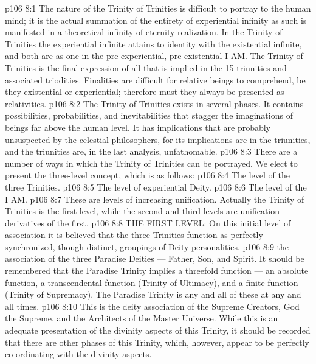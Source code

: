 \vs p106 8:1 The nature of the Trinity of Trinities is difficult to portray to the human mind; it is the actual summation of the entirety of experiential infinity as such is manifested in a theoretical infinity of eternity realization. In the Trinity of Trinities the experiential infinite attains to identity with the existential infinite, and both are as one in the pre\hyp{}experiential, pre\hyp{}existential I AM. The Trinity of Trinities is the final expression of all that is implied in the 15 triunities and associated triodities. Finalities are difficult for relative beings to comprehend, be they existential or experiential; therefore must they always be presented as relativities.
\vs p106 8:2 The Trinity of Trinities exists in several phases. It contains possibilities, probabilities, and inevitabilities that stagger the imaginations of beings far above the human level. It has implications that are probably unsuspected by the celestial philosophers, for its implications are in the triunities, and the triunities are, in the last analysis, unfathomable.
\vs p106 8:3 There are a number of ways in which the Trinity of Trinities can be portrayed. We elect to present the three\hyp{}level concept, which is as follows:
\vs p106 8:4 \bibnobreakspace The level of the three Trinities.
\vs p106 8:5 \bibnobreakspace The level of experiential Deity.
\vs p106 8:6 \bibnobreakspace The level of the I AM.
\vs p106 8:7 \pc These are levels of increasing unification. Actually the Trinity of Trinities is the first level, while the second and third levels are unification\hyp{}derivatives of the first.
\vs p106 8:8 \pc THE FIRST LEVEL: On this initial level of association it is believed that the three Trinities function as perfectly synchronized, though distinct, groupings of Deity personalities.
\vs p106 8:9 \bibnobreakspace {} the association of the three Paradise Deities --- Father, Son, and Spirit. It should be remembered that the Paradise Trinity implies a threefold function --- an absolute function, a transcendental function (Trinity of Ultimacy), and a finite function (Trinity of Supremacy). The Paradise Trinity is any and all of these at any and all times.
\vs p106 8:10 \bibnobreakspace {} This is the deity association of the Supreme Creators, God the Supreme, and the Architects of the Master Universe. While this is an adequate presentation of the divinity aspects of this Trinity, it should be recorded that there are other phases of this Trinity, which, however, appear to be perfectly co\hyp{}ordinating with the divinity aspects.
